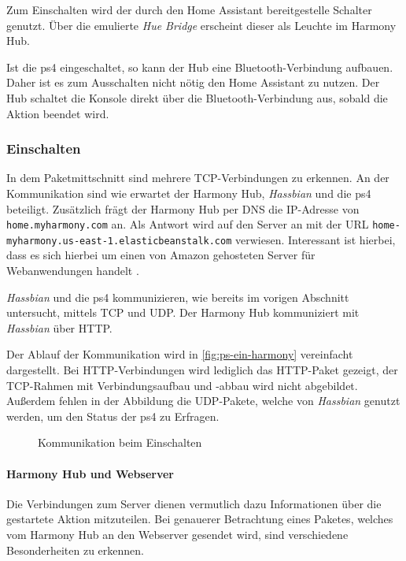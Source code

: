 Zum Einschalten wird der durch den Home Assistant bereitgestelle Schalter genutzt.
Über die emulierte \textit{Hue Bridge} erscheint dieser als Leuchte im Harmony Hub.

Ist die \ac{ps4} eingeschaltet, so kann der Hub eine Bluetooth-Verbindung aufbauen.
Daher ist es zum Ausschalten nicht nötig den Home Assistant zu nutzen.
Der Hub schaltet die Konsole direkt über die Bluetooth-Verbindung aus,
sobald die Aktion beendet wird.

\subsubsection{Einschalten}
In dem Paketmittschnitt sind mehrere TCP-Verbindungen zu erkennen.
An der Kommunikation sind wie erwartet der Harmony Hub, \textit{Hassbian} und die \ac{ps4} beteiligt.
Zusätzlich frägt der Harmony Hub per DNS die IP-Adresse von \nolinkurl{home.myharmony.com} an.
Als Antwort wird auf den Server an mit der URL \nolinkurl{home-myharmony.us-east-1.elasticbeanstalk.com} verwiesen.
Interessant ist hierbei,
dass es sich hierbei um einen von Amazon gehosteten Server für Webanwendungen handelt \cite{AWSElast48:online}.

\textit{Hassbian} und die \ac{ps4} kommunizieren, wie bereits im vorigen Abschnitt untersucht, mittels TCP und UDP.
Der Harmony Hub kommuniziert mit \textit{Hassbian} über HTTP.

Der Ablauf der Kommunikation wird in \autoref{fig:ps-ein-harmony} vereinfacht dargestellt.
Bei HTTP-Verbindungen wird lediglich das HTTP-Paket gezeigt,
der TCP-Rahmen mit Verbindungsaufbau und -abbau wird nicht abgebildet.
Außerdem fehlen in der Abbildung die UDP-Pakete,
welche von \textit{Hassbian} genutzt werden,
um den Status der \ac{ps4} zu Erfragen.
\begin{figure}
    \centering
    \resizebox{\textwidth}{!}{
        
    }
    \caption{Kommunikation beim Einschalten}
    \label{fig:ps-ein-harmony}
\end{figure}

\newpage



\paragraph{Harmony Hub und Webserver}
Die Verbindungen zum Server dienen vermutlich dazu Informationen über die gestartete Aktion mitzuteilen.
Bei genauerer Betrachtung eines Paketes, welches vom Harmony Hub an den Webserver gesendet wird,
sind verschiedene Besonderheiten zu erkennen.


